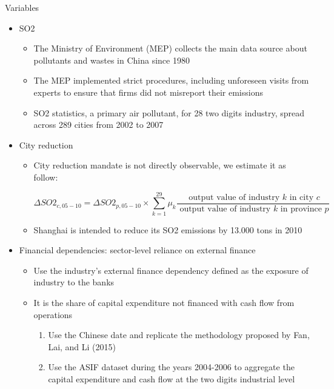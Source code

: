 \documentclass{beamer}
\begin{document}
\begin{framefont}{\small}{\scriptsize}{\scriptsize}
    \begin{frame}{Variables}
        \begin{itemize}
            \item SO2
            \begin{itemize}
                \item The Ministry of Environment (MEP) collects the main data source about pollutants and wastes in China since 1980
                \item The MEP implemented strict procedures, including unforeseen visits from experts to ensure that firms did not misreport their emissions
                \item SO2 statistics, a primary air pollutant, for 28 two digits industry, spread across 289 cities from 2002 to 2007
            \end{itemize}
            \item City reduction
            \begin{itemize}
                \item  City reduction mandate is not directly observable, we estimate it as follow:
            
                \tiny \begin{equation*}
                    \Delta SO2_{c, 05 - 10}=\Delta SO2_{p, 05 - 10} \times \sum_{k=1}^{29} \mu_{k} \frac{\text { output value of industry } k \text { in city } c}{\text { output value of industry } k \text { in province } p}
                \end{equation*}
                \item Shanghai is intended to reduce its SO2 emissions by 13.000 tons in 2010
            \end{itemize}
            \item Financial dependencies: sector-level reliance on external finance
            \begin{itemize}
                \item Use the industry’s external finance dependency defined as the exposure of industry to the banks
                \item It is the share of capital expenditure not financed with cash flow from operations
                \begin{enumerate}
                    \item Use the Chinese date and replicate the methodology proposed by Fan, Lai, and Li (2015)
                    \item Use the ASIF dataset during the years 2004-2006 to aggregate the capital expenditure and cash flow at the two digits industrial level
                \end{enumerate}
            \end{itemize}
        \end{itemize}
    \end{frame}
\end{framefont}
\end{document}
